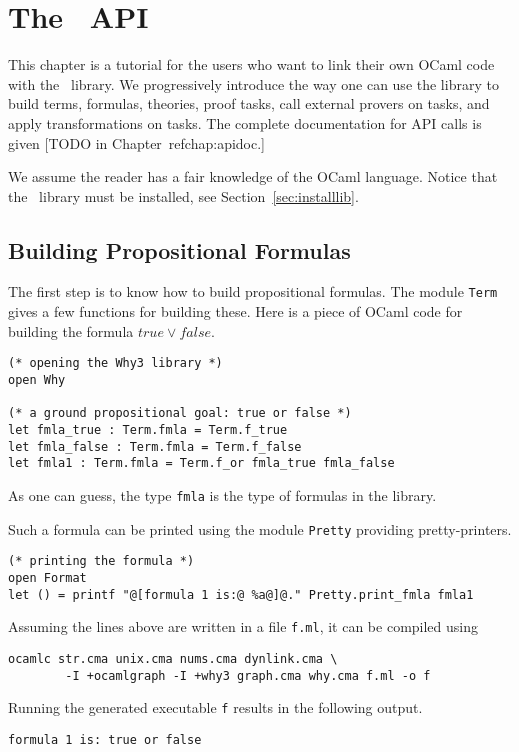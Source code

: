 \chapter{The \why\ API}
\label{chap:api}

This chapter is a tutorial for the users who want to link their own
OCaml code with the \why\ library. We progressively introduce the way
one can use the library to build terms, formulas, theories, proof
tasks, call external provers on tasks, and apply transformations on
tasks. The complete documentation for API calls is given
[TODO in Chapter~ref{chap:apidoc}.]

We assume the reader has a fair knowledge of the OCaml
language. Notice that the \why\ library must be installed,
see Section~\ref{sec:installlib}.


\section{Building Propositional Formulas}

The first step is to know how to build propositional formulas. The
module \texttt{Term} gives a few functions for building these. Here is
a piece of OCaml code for building the formula $true \lor false$.
\begin{verbatim}
(* opening the Why3 library *)
open Why

(* a ground propositional goal: true or false *)
let fmla_true : Term.fmla = Term.f_true
let fmla_false : Term.fmla = Term.f_false
let fmla1 : Term.fmla = Term.f_or fmla_true fmla_false
\end{verbatim}
As one can guess, the type \texttt{fmla} is the type of formulas in
the library.

Such a formula can be printed using the module \texttt{Pretty}
providing pretty-printers.
\begin{verbatim}
(* printing the formula *)
open Format
let () = printf "@[formula 1 is:@ %a@]@." Pretty.print_fmla fmla1
\end{verbatim}

Assuming the lines above are written in a file \texttt{f.ml}, it can
be compiled using
\begin{verbatim}
ocamlc str.cma unix.cma nums.cma dynlink.cma \
        -I +ocamlgraph -I +why3 graph.cma why.cma f.ml -o f
\end{verbatim}
Running the generated executable \texttt{f} results in the following output.
\begin{verbatim}
formula 1 is: true or false
\end{verbatim}

